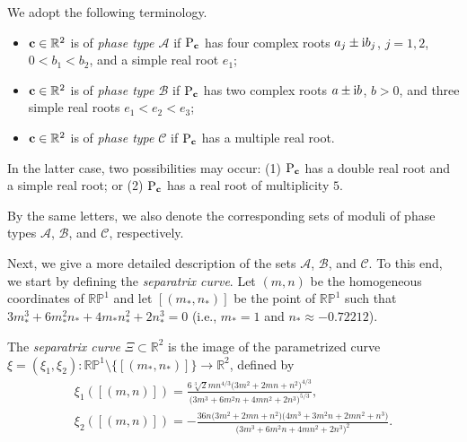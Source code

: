 \documentclass[10pt,a4paper]{amsart}
\numberwithin{equation}{section}
\def\R{\mathbb{R}}
\begin{document}
\begin{Definition}%
We adopt the following terminology.
\begin{itemize}\itemsep=0pt

\item ${\bf c}\in \R^2$ is of \emph{phase type ${\mathcal A}$} if ${\rm P}_{{\bf c}}$ has four complex roots $a_j\pm {\rm i}b_j$, $j=1,2$, $0<b_1<b_2$,
and a simple real root $e_1$;

\item ${\bf c}\in \R^2$ is of \emph{phase type ${\mathcal B}$} if ${\rm P}_{{\bf c}}$ has two complex roots $a \pm {\rm i}b$,
$b>0$, and three simple real roots
$e_1<e_2<e_3$;

\item ${\bf c}\in \R^2$ is of \emph{phase type} ${\mathcal C}$ if ${\rm P}_{{\bf c}}$ has a multiple {real} root.
\end{itemize}
In the latter case, two possibilities may occur: (1) ${\rm P}_{{\bf c}}$ has a double real root and a simple real root; or
(2) ${\rm P}_{{\bf c}}$ has a {real} root of multiplicity $5$.
%

By the same letters, we also denote the corresponding sets of moduli of
phase types ${\mathcal A}$, ${\mathcal B}$, and ${\mathcal C}$, respectively.
\end{Definition}

Next, we give a more detailed description of the sets ${\mathcal A}$, ${\mathcal B}$, and ${\mathcal C}$.
%
%
To this end, we start by defining the \emph{separatrix curve}. Let
$(m,n)$ be the homogeneous coordinates of $\mathbb{RP}^1$ and let $[(m_*,n_*)]$ be the point of $\mathbb{RP}^1$ such that $3m_*^3+6m_*^2n_*+4m_*n_*^2+2n_*^3=0$ (i.e., $m_*=1$ and $n_*\approx-0.72212$).

\begin{Definition}
The \emph{separatrix curve} $\Xi\subset \R^2$ is the image of the parametrized curve
$\xi =(\xi_1,\xi_2) \colon \mathbb{RP}^1\setminus\{[(m_*,n_*)]\}\to \R^2$, defined by
\begin{gather*}
{\xi_1([(m,n)])}=\frac{6\sqrt[3]{2}mn^{4/3}\big(3m^2+2mn+n^2\big)^{4/3}}{\big(3m^3+6m^2n+4mn^2+2n^3\big)^{5/3}},\\
{\xi_2([(m,n)])}=-\frac{36n\big(3m^2+2mn+n^2\big)\big(4m^3+3m^2n+2mn^2+n^3\big)}{\big(3m^3+6m^2n+4mn^2 + 2n^3\big)^{2}}.
\end{gather*}
\end{Definition}
\end{document}
